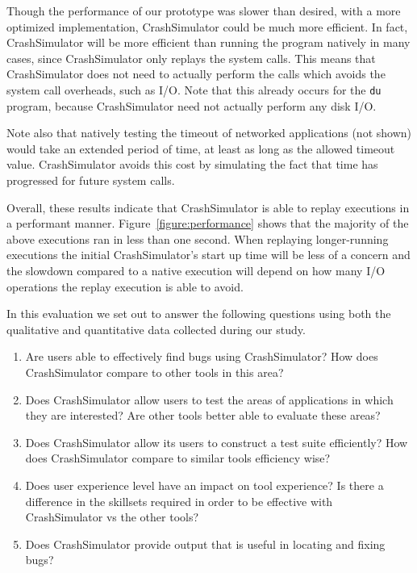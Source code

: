 Though the performance of our prototype was slower than desired, with a
more optimized implementation, CrashSimulator could be much more efficient.
In fact, CrashSimulator will be more efficient than running the program
natively in many cases, since CrashSimulator only replays the system calls.
This means that CrashSimulator does not need to actually perform the calls
which avoids the system call overheads, such as I/O.  Note that this
already occurs for the {\tt du} program, because CrashSimulator need not
actually perform any disk I/O.

Note also that natively testing the timeout of networked applications (not
shown) would take an extended period of time, at least as long as the
allowed timeout value.  CrashSimulator avoids this cost by simulating the
fact that time has progressed for future system calls.

Overall, these results indicate that CrashSimulator is able to replay
executions in a performant manner.  Figure~\ref{figure:performance} shows
that the majority of the above executions ran in less than one second.
When replaying longer-running executions the initial CrashSimulator's start
up time will be less of a concern and the slowdown compared to a native
execution will depend on how many I/O operations the replay execution is
able to avoid.


In this evaluation we set out to answer the following questions using both
the qualitative and quantitative data collected during our study.

\begin{enumerate}

\item Are users able to effectively find bugs using CrashSimulator?  How
does CrashSimulator compare to other tools in this area?

\item Does CrashSimulator allow users to test the areas of
applications in which they are interested?  Are other tools better able to
evaluate these areas?

\item Does CrashSimulator allow its users to construct a test suite
efficiently?  How does CrashSimulator compare to similar tools
efficiency wise?

\item Does user experience level have an impact on tool experience?  Is
there a difference in the skillsets required in order to be effective
with CrashSimulator vs the other tools?

\item Does CrashSimulator provide output that is useful in locating and
fixing bugs?

\end{enumerate}


